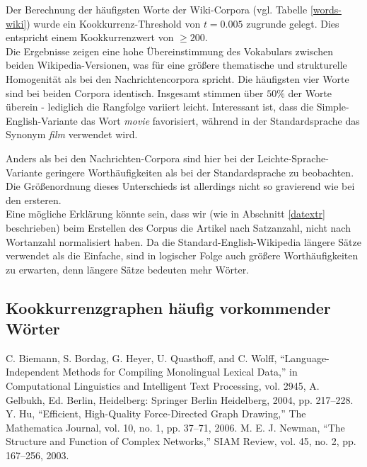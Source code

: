 \documentclass[11pt, a4paper]{article}
\begin{document}
Der Berechnung der häufigsten Worte der Wiki-Corpora (vgl. Tabelle \ref{words-wiki}) wurde ein Kookkurrenz-Threshold von $t=0.005$ zugrunde gelegt.
Dies entspricht einem Kookkurrenzwert von $\geq 200$.\\
Die Ergebnisse zeigen eine hohe Übereinstimmung des Vokabulars zwischen beiden Wikipedia-Versionen, was für eine größere thematische und strukturelle Homogenität als bei den Nachrichtencorpora spricht.
Die häufigsten vier Worte sind bei beiden Corpora identisch.
Insgesamt stimmen über $50\%$ der Worte überein - lediglich die Rangfolge variiert leicht.
Interessant ist, dass die Simple-English-Variante das Wort \textit{movie} favorisiert, während in der Standardsprache das Synonym \textit{film} verwendet wird.

Anders als bei den Nachrichten-Corpora sind hier bei der Leichte-Sprache-Variante geringere Worthäufigkeiten als bei der Standardsprache zu beobachten.
Die Größenordnung dieses Unterschieds ist allerdings nicht so gravierend wie bei den ersteren.\\
Eine mögliche Erklärung könnte sein, dass wir (wie in Abschnitt \ref{datextr} beschrieben) beim Erstellen des Corpus die Artikel nach Satzanzahl, nicht nach Wortanzahl normalisiert haben.
Da die Standard-English-Wikipedia längere Sätze verwendet als die Einfache, sind in logischer Folge auch größere Worthäufigkeiten zu erwarten, denn längere Sätze bedeuten mehr Wörter.



\subsection{Kookkurrenzgraphen häufig vorkommender Wörter}

\newpage
\begin{thebibliography}{9}
     C. Biemann, S. Bordag, G. Heyer, U. Quasthoff, and C. Wolff, “Language-Independent Methods for Compiling Monolingual Lexical Data,” in Computational Linguistics and Intelligent Text Processing, vol. 2945, A. Gelbukh, Ed. Berlin, Heidelberg: Springer Berlin Heidelberg, 2004, pp. 217–228.
	 Y. Hu, “Efficient, High-Quality Force-Directed Graph Drawing,” The Mathematica Journal, vol. 10, no. 1, pp. 37–71, 2006.
     M. E. J. Newman, “The Structure and Function of Complex Networks,” SIAM Review, vol. 45, no. 2, pp. 167–256, 2003.
\end{thebibliography}

\listoftables

\listoffigures
\end{document}

